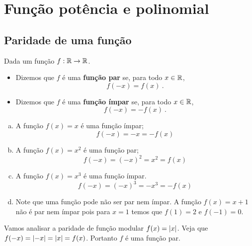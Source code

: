 \chapter{Função potência e polinomial}


\section{Paridade de uma função}

 \begin{obs}
  Dada um função $f: \mathbb{R} \rightarrow \mathbb{R}$.

\begin{itemize}
    \item   Dizemos que $f$ é uma \textbf{função par} se, para todo $x \in \mathbb{R}$,
\begin{equation*}
f(-x)= f(x) \ .
\end{equation*}
  \item Dizemos que $f$ é uma \textbf{função ímpar} se, para todo $x \in \mathbb{R}$,
\begin{equation*}
f(-x)= - f(x) \ .
\end{equation*}
\end{itemize}
\end{obs}


 \begin{exem}
  \begin{enumerate}[a)]
   \item A função $f(x)= x$ é uma função ímpar;
\begin{equation*}
f(-x)= -x= -f(x) 
\end{equation*}
   \item A função $f(x)= x^2$ é uma função par;
\begin{equation*}
f(-x)= (-x)^2= x^2 = f(x) 
\end{equation*}
   \item A função $f(x)= x^3$ é uma função ímpar.
\begin{equation*}
f(-x)= (-x)^3= -x^3= -f(x)
\end{equation*}

\item Note que uma função pode não ser par nem ímpar. A função $f(x)=x+1$ não é par nem ímpar pois para $x=1$ temos que $f(1)=2$ e $f(-1)=0$.
  \end{enumerate}
 \end{exem}

 \begin{exem}
  Vamos analisar a paridade de função modular $f(x)= \left|x\right|$.
    Veja que $f(-x)=\left|-x\right|=\left|x\right|=f(x)$. Portanto $f$ é uma função par.
 \end{exem}

